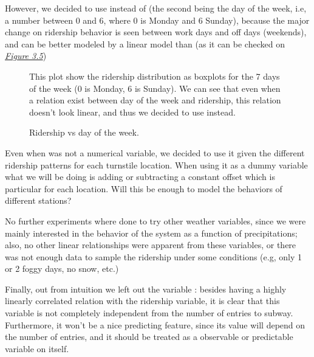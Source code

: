 \documentclass[a4paper,12pt,english]{sphinxmanual}
\begin{document}
However, we decided to use  instead of  (the second being the
day of the week, i.e, a number between 0 and 6, where 0 is Monday and 6 Sunday),
because the major change on ridership behavior is seen between work days and
off days (weekends), and  can be better modeled by a linear model than
 (as it can be checked on {\hyperref[section2:figure35]{\emph{Figure 3.5}}})
\begin{figure}[htbp]
\centering
\capstart

\caption{Ridership vs day of the week.}{\small 
This plot show the ridership distribution as boxplots for the 7 days of the
week (0 is Monday, 6 is Sunday). We can see that even when a relation
exist between day of the week and ridership, this relation doesn't look
linear, and thus we decided to use  instead.
}\label{section2:figure35}\end{figure}

Even when  was not a numerical variable, we decided to use it given the
different ridership patterns for each turnstile location. When using it as
a dummy variable what we will be doing is adding or subtracting a constant
offset which is particular for each location. Will this be enough to model
the behaviors of different stations?

No further experiments where done to try other weather variables, since we were
mainly interested in the behavior of the system as a function of precipitations;
also, no other linear relationships were apparent from these variables, or
there was not enough data to sample the ridership under some conditions (e.g,
only 1 or 2 foggy days, no snow, etc.)

Finally, out from intuition we left out the variable : besides having a
highly linearly correlated relation with the ridership variable, it is clear
that this variable is not completely independent from the number of entries to
subway. Furthermore, it won't be a nice predicting feature, since its value
will depend on the number of entries, and it should be treated as a observable
or predictable variable on itself.
\end{document}

